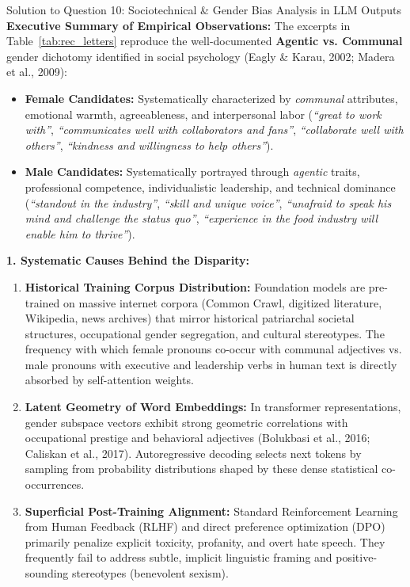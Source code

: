 \documentclass[11pt,a4paper]{article}
\begin{document}
\begin{solutionbox}{Solution to Question 10: Sociotechnical \& Gender Bias Analysis in LLM Outputs}
\textbf{Executive Summary of Empirical Observations:}
The excerpts in Table~\ref{tab:rec_letters} reproduce the well-documented \textbf{Agentic vs. Communal} gender dichotomy identified in social psychology (Eagly \& Karau, 2002; Madera et al., 2009):
\begin{itemize}[leftmargin=1.5em]
    \item \textbf{Female Candidates:} Systematically characterized by \textit{communal} attributes, emotional warmth, agreeableness, and interpersonal labor (\textit{“great to work with”}, \textit{“communicates well with collaborators and fans”}, \textit{“collaborate well with others”}, \textit{“kindness and willingness to help others”}).
    \item \textbf{Male Candidates:} Systematically portrayed through \textit{agentic} traits, professional competence, individualistic leadership, and technical dominance (\textit{“standout in the industry”}, \textit{“skill and unique voice”}, \textit{“unafraid to speak his mind and challenge the status quo”}, \textit{“experience in the food industry will enable him to thrive”}).
\end{itemize}

\medskip
\textbf{1. Systematic Causes Behind the Disparity:}
\begin{enumerate}[label=\alph*.,leftmargin=1.8em]
    \item \textbf{Historical Training Corpus Distribution:} Foundation models are pre-trained on massive internet corpora (Common Crawl, digitized literature, Wikipedia, news archives) that mirror historical patriarchal societal structures, occupational gender segregation, and cultural stereotypes. The frequency with which female pronouns co-occur with communal adjectives vs. male pronouns with executive and leadership verbs in human text is directly absorbed by self-attention weights.
    \item \textbf{Latent Geometry of Word Embeddings:} In transformer representations, gender subspace vectors exhibit strong geometric correlations with occupational prestige and behavioral adjectives (Bolukbasi et al., 2016; Caliskan et al., 2017). Autoregressive decoding selects next tokens by sampling from probability distributions shaped by these dense statistical co-occurrences.
    \item \textbf{Superficial Post-Training Alignment:} Standard Reinforcement Learning from Human Feedback (RLHF) and direct preference optimization (DPO) primarily penalize explicit toxicity, profanity, and overt hate speech. They frequently fail to address subtle, implicit linguistic framing and positive-sounding stereotypes (benevolent sexism).
\end{enumerate}


\end{solutionbox}
\end{document}
